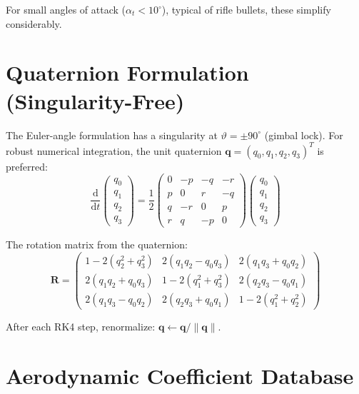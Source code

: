 \documentclass[11pt,twoside,openright]{report}
\newcommand{\dd}{\mathrm{d}}
\begin{document}
For small angles of attack ($\alpha_t < 10^{\circ}$), typical of rifle bullets, these simplify considerably.

\section{Quaternion Formulation (Singularity-Free)}

The Euler-angle formulation has a singularity at $\vartheta = \pm 90^{\circ}$ (gimbal lock). For robust numerical integration, the unit quaternion $\bm{q} = (q_0, q_1, q_2, q_3)^T$ is preferred:
\begin{equation}
  \frac{\dd}{\dd t}\begin{pmatrix}q_0\\q_1\\q_2\\q_3\end{pmatrix}
  = \frac{1}{2}\begin{pmatrix}
    0 & -p & -q & -r\\
    p &  0 &  r & -q\\
    q & -r &  0 &  p\\
    r &  q & -p &  0
  \end{pmatrix}
  \begin{pmatrix}q_0\\q_1\\q_2\\q_3\end{pmatrix}
  \label{eq:quat_ode}
\end{equation}

The rotation matrix from the quaternion:
\begin{equation}
  \bm{R} = \begin{pmatrix}
    1-2(q_2^2+q_3^2) & 2(q_1 q_2 - q_0 q_3) & 2(q_1 q_3 + q_0 q_2)\\
    2(q_1 q_2 + q_0 q_3) & 1-2(q_1^2+q_3^2) & 2(q_2 q_3 - q_0 q_1)\\
    2(q_1 q_3 - q_0 q_2) & 2(q_2 q_3 + q_0 q_1) & 1-2(q_1^2+q_2^2)
  \end{pmatrix}
  \label{eq:quat_to_R}
\end{equation}

After each RK4 step, renormalize: $\bm{q} \leftarrow \bm{q}/\|\bm{q}\|$.

\section{Aerodynamic Coefficient Database}
\end{document}
